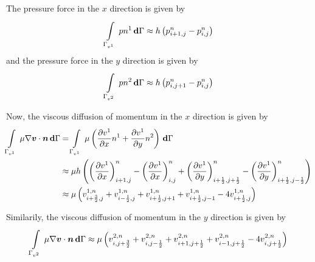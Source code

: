 The pressure force in the $x$ direction is given by
\begin{equation}
    \displaystyle\int\limits_{\Gamma_{v^{1}}}^{} \,pn^{1}\, \boldsymbol{\mathrm{d}} \Gamma \approx h\left( p^{n}_{i+1,j}-p^{n}_{i,j} \right)
\end{equation}
and the pressure force in the $y$ direction is given by
\begin{equation}
    \displaystyle\int\limits_{\Gamma_{v^{2}}}^{} \,pn^{2}\, \boldsymbol{\mathrm{d}} \Gamma \approx h\left( p^{n}_{i,j+1}-p^{n}_{i,j} \right)
\end{equation}

Now, the viscous diffusion of momentum in the $x$ direction is given by
\begin{equation}
  \begin{split}
    \gint{\Gamma_{v^{1}}}{}{\dotprod{\mu\gradient{}{\vectr{v}}}{\vectr{n}}}{\Gamma}
    &=\gint{\Gamma_{v^{1}}}{}{\mu\pbrac{\delby{v^{1}}{x}n^{1}+\delby{v^{1}}{y}n^{2}}}{\Gamma} \\
    &\approx\mu h\pbrac{\pbrac{\delby{v^{1}}{x}}^{n}_{i+1,j}-\pbrac{\delby{v^{1}}{x}}^{n}_{i,j}
      +\pbrac{\delby{v^{1}}{y}}^{n}_{i+\frac{1}{2},j+\frac{1}{2}}-
      \pbrac{\delby{v^{1}}{y}}^{n}_{i+\frac{1}{2},j-\frac{1}{2}}}\\
    &\approx \mu\pbrac{v^{1,n}_{i+\frac{3}{2},j}+v^{1,n}_{i-\frac{1}{2},j}
      +v^{1,n}_{i+\frac{1}{2},j+1}+v^{1,n}_{i+\frac{1}{2},j-1}-4v^{1,n}_{i+\frac{1}{2},j}}
  \end{split}
\end{equation}

Similarily, the viscous diffusion of momentum in the $y$ direction is given by
\begin{equation}
  \gint{\Gamma_{v^{2}}}{}{\dotprod{\mu\gradient{}{\vectr{v}}}{\vectr{n}}}{\Gamma}
  \approx \mu\pbrac{v^{2,n}_{i,j+\frac{3}{2}}+v^{2,n}_{i,j-\frac{1}{2}}
    +v^{2,n}_{i+1,j+\frac{1}{2}}+v^{2,n}_{i-1,j+\frac{1}{2}}-4v^{2,n}_{i,j+\frac{1}{2}}}
\end{equation}


